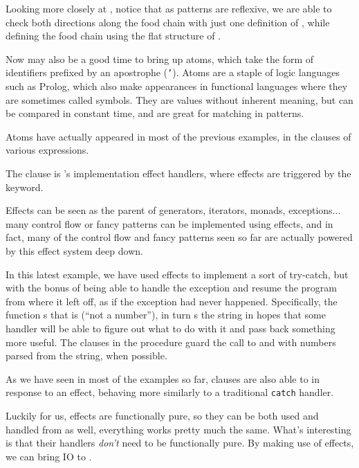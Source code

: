 
Looking more closely at \Law{}, notice that as patterns are reflexive, we are
able to check both directions along the food chain with just one definition of
, while defining the food chain using the flat structure of .

Now may also be a good time to bring up atoms, which take the form of identifiers
prefixed by an apostrophe (\texttt{'}). Atoms are a staple of logic languages
such as Prolog, which also make appearances in functional languages where
they are sometimes called symbols. They are values without inherent meaning,
but can be compared in constant time, and are great for matching in patterns.

Atoms have actually appeared in most of the previous examples, in the 
clauses of various expressions.


The  clause is \Trilogy{}'s implementation effect handlers, where
effects are triggered by the  keyword.

Effects can be seen as the parent of generators, iterators, monads,
exceptions... many control flow or fancy patterns can be implemented using
effects, and in fact, many of the control flow and fancy patterns seen so far
are actually powered by this effect system deep down.

In this latest example, we have used effects to implement a sort of try-catch,
but with the bonus of being able to handle the exception and resume the program
from where it left off, as if the exception had never happened. Specifically,
 the  function s that  is 
(``not a number''),  in turn s the string in hopes that
some handler will be able to figure out what to do with it and pass back something
more useful. The  clauses in the  procedure guard the call to
 and  with numbers parsed from the string, when possible.

As we have seen in most of the examples so far,  clauses are also able
to  in response to an effect, behaving more similarly to a traditional
\texttt{catch} handler.


Luckily for us, effects are functionally pure, so they can be both used and
handled from \Poetry{} as well, everything works pretty much the same. What's
interesting is that their handlers \emph{don't} need to be functionally pure.
By making use of effects, we can bring IO to \Poetry{}.

